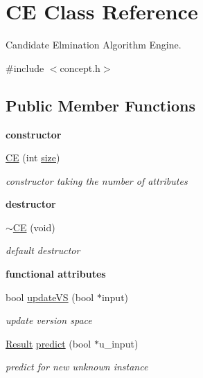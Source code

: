 \hypertarget{class_c_e}{\section{C\-E Class Reference}
\label{class_c_e}
}


Candidate Elmination Algorithm Engine.  




{\ttfamily \#include $<$concept.\-h$>$}

\subsection*{Public Member Functions}
\begin{Indent}{\bf constructor}\par
\begin{DoxyCompactItemize}
\item 
\hyperlink{class_c_e_a62a628258f85e6346da8b664dc460e9a}{C\-E} (int \hyperlink{class_c_e_a379f23d0ec5cc0448ad7c1428403e005}{size})
\begin{DoxyCompactList}\small\item\em constructor taking the number of attributes \end{DoxyCompactList}\end{DoxyCompactItemize}
\end{Indent}
\begin{Indent}{\bf destructor}\par
\begin{DoxyCompactItemize}
\item 
\hyperlink{class_c_e_a1b259b861a0aa7a0a45027765968017b}{$\sim$\-C\-E} (void)
\begin{DoxyCompactList}\small\item\em default destructor \end{DoxyCompactList}\end{DoxyCompactItemize}
\end{Indent}
\begin{Indent}{\bf functional attributes}\par
\begin{DoxyCompactItemize}
\item 
bool \hyperlink{class_c_e_a73ea02a691a61601d2cbcfb4bbe5a0fc}{update\-V\-S} (bool $\ast$input)
\begin{DoxyCompactList}\small\item\em update version space \end{DoxyCompactList}\item 
\hyperlink{concept_8h_a28287671eaf7406afd604bd055ba4066}{Result} \hyperlink{class_c_e_a66c1015e6889104f2d64349d2b6f114a}{predict} (bool $\ast$u\-\_\-input)
\begin{DoxyCompactList}\small\item\em predict for new unknown instance \end{DoxyCompactList}\end{DoxyCompactItemize}
\end{Indent}
